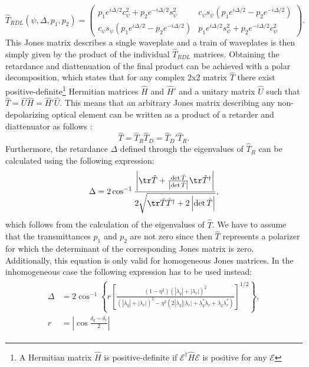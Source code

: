 \begin{equation}
    \hat{T}_{RDL}(\psi, \Delta, p_1, p_2) = 
    \begin{pmatrix} 
    p_1e^{i\Delta/2}c_{\psi}^2+p_2e^{-i\Delta/2}s_{\psi}^2 & c_{\psi}s_{\psi}\left(p_1e^{i\Delta/2}-p_2e^{-i\Delta/2}\right) \\
    c_{\psi}s_{\psi}\left(p_1e^{i\Delta/2}-p_2e^{-i\Delta/2}\right) & 
    p_1e^{i\Delta/2}s_{\psi}^2+p_2e^{-i\Delta/2}c_{\psi}^2
    \end{pmatrix}.
\end{equation}
This Jones matrix describes a single waveplate and a train of waveplates is then simply given by the product of the individual $\hat{T}_{RDL}$ matrices. Obtaining the retardance and diattenuation of the final product can be achieved with a polar decomposition, which states that for any complex 2x2 matrix $\hat{T}$ there exist positive-definite\footnote{A Hermitian matrix $\hat{H}$ is positive-definite if $\bm{\mathcal{E}}^{\dagger}\hat{H}\bm{\mathcal{E}}$ is positive for any $\bm{\mathcal{E}}$} Hermitian matrices $\hat{H}$ and $\hat{H}'$ and a unitary matrix $\hat{U}$ such that $\hat{T}=\hat{U}\hat{H}=\hat{H}'\hat{U}$. This means that an arbitrary Jones matrix describing any non-depolarizing optical element can be written as a product of a retarder and diattenuator as follows \cite{GilPerez2017}:
\begin{equation}
    \hat{T} = \hat{T}_R\hat{T}_D = \hat{T}_D'\hat{T}_R.
    \label{eq:diattenuation_retarder}
\end{equation}
Furthermore, the retardance $\Delta$ defined through the eigenvalues of $\hat{T}_R$ can be calculated using the following expression:
\begin{equation}
    \Delta = 2 \cos^{-1} \frac{\left|\tr\hat{T}+\frac{\det \hat{T}}{\left|\det \hat{T}\right|} \tr \hat{T}^{\dagger}\right|}{2\sqrt{\tr \hat{T}\hat{T}^{\dagger}+2\left|\det \hat{T}\right|}},
\end{equation}
which follows from the calculation of the eigenvalues of $\hat{T}$. We have to assume that the transmittances $p_1$ and $p_2$ are not zero since then $\hat{T}$ represents a polarizer for which the determinant of the corresponding Jones matrix is zero. Additionally, this equation is only valid for homogeneous Jones matrices. In the inhomogeneous case the following expression has to be used instead:
\begin{align}
\begin{split}
    \label{eq:retardation_inhomogeneous}
    \Delta &= 2\cos^{-1}\left\{r\left[\frac{(1-\eta^2)(|\lambda_q|+|\lambda_r|)^2}
    {(|\lambda_q|+|\lambda_r|)^2-\eta^2(2|\lambda_q||\lambda_r|+\lambda_q^*\lambda_r+\lambda_q\lambda_r^*)}\right]^{1/2}\right\}, \\
    r &= \left|\cos \frac{\delta_q-\delta_r}{2}\right|
\end{split}
\end{align}
